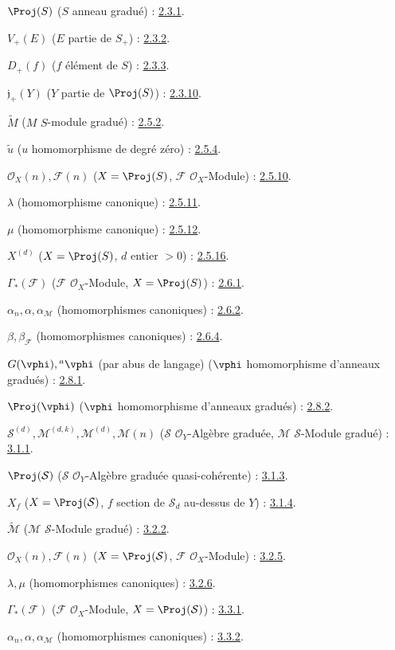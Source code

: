 $\Proj(S)$ ($S$ anneau gradué) : \hyperref[II.2.3.1-fr]{2.3.1}.

$V_+(E)$ ($E$ partie de $S_+$) : \hyperref[II.2.3.2-fr]{2.3.2}.

$D_+(f)$ ($f$ élément de $S$) : \hyperref[II.2.3.3-fr]{2.3.3}.

$\mathfrak j_+(Y)$ ($Y$ partie de $\Proj(S)$) : \hyperref[II.2.3.10-fr]{2.3.10}.

$\widetilde M$ ($M$ $S$-module gradué) : \hyperref[II.2.5.2-fr]{2.5.2}.

$\widetilde u$ ($u$ homomorphisme de degré zéro) : \hyperref[II.2.5.4-fr]{2.5.4}.

$\mathcal{O}_X(n),\mathcal{F}(n)$
($X=\Proj(S)$, $\mathcal{F}$ $\mathcal{O}_X$-Module) : \hyperref[II.2.5.10-fr]{2.5.10}.

$\lambda$ (homomorphisme canonique) : \hyperref[II.2.5.11-fr]{2.5.11}.

$\mu$ (homomorphisme canonique) : \hyperref[II.2.5.12-fr]{2.5.12}.

$X^{(d)}$ ($X=\Proj(S)$, $d$ entier $>0$) : \hyperref[II.2.5.16-fr]{2.5.16}.

$\Gamma_*(\mathcal{F})$ ($\mathcal{F}$ $\mathcal{O}_X$-Module,
$X=\Proj(S)$) : \hyperref[II.2.6.1-fr]{2.6.1}.

$\alpha_n,\alpha,\alpha_{\mathcal{M}}$ (homomorphismes canoniques) : \hyperref[II.2.6.2-fr]{2.6.2}.

$\beta,\beta_{\mathcal{F}}$ (homomorphismes canoniques) : \hyperref[II.2.6.4-fr]{2.6.4}.

$G(\vphi),{}^a\vphi$ (par abus de langage)
($\vphi$ homomorphisme d'anneaux gradués) : \hyperref[II.2.8.1-fr]{2.8.1}.

$\Proj(\vphi)$ ($\vphi$ homomorphisme d'anneaux gradués) : \hyperref[II.2.8.2-fr]{2.8.2}.

$\mathcal{S}^{(d)},\mathcal{M}^{(d,k)},\mathcal{M}^{(d)},\mathcal{M}(n)$
($\mathcal{S}$ $\mathcal{O}_Y$-Algèbre graduée,
$\mathcal{M}$ $\mathcal{S}$-Module gradué) : \hyperref[II.3.1.1-fr]{3.1.1}.

$\Proj(\mathcal{S})$ ($\mathcal{S}$ $\mathcal{O}_Y$-Algèbre graduée quasi-cohérente) : \hyperref[II.3.1.3-fr]{3.1.3}.

$X_f$ ($X=\Proj(\mathcal{S})$, $f$ section de $\mathcal{S}_d$ au-dessus de $Y$) : \hyperref[II.3.1.4-fr]{3.1.4}.

$\widetilde{\mathcal{M}}$ ($\mathcal{M}$ $\mathcal{S}$-Module gradué) : \hyperref[II.3.2.2-fr]{3.2.2}.

$\mathcal{O}_X(n),\mathcal{F}(n)$
($X=\Proj(\mathcal{S})$, $\mathcal{F}$ $\mathcal{O}_X$-Module) : \hyperref[II.3.2.5-fr]{3.2.5}.

$\lambda,\mu$ (homomorphismes canoniques) : \hyperref[II.3.2.6-fr]{3.2.6}.

$\Gamma_*(\mathcal{F})$ ($\mathcal{F}$ $\mathcal{O}_X$-Module,
$X=\Proj(\mathcal{S})$) : \hyperref[II.3.3.1-fr]{3.3.1}.

$\alpha_n,\alpha,\alpha_{\mathcal{M}}$ (homomorphismes canoniques) : \hyperref[II.3.3.2-fr]{3.3.2}.

